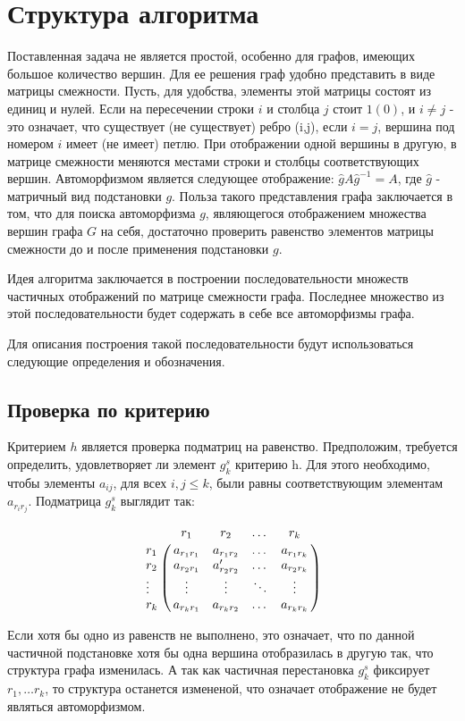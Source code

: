 \section{Структура алгоритма}
\label{sec:AlgoStruct_3} 
\large

Поставленная задача не является простой, особенно для графов, имеющих большое количество вершин. Для ее решения граф удобно представить в виде матрицы смежности. Пусть, для удобства, элементы этой матрицы состоят из единиц и нулей. Если на пересечении строки $i$ и столбца $j$ стоит $1(0)$, и $i\neq j$ - это означает, что существует (не существует) ребро (i,j), если $i = j$, вершина под номером $i$ имеет (не имеет) петлю. При отображении одной вершины в другую, в матрице смежности меняются местами строки и столбцы соответствующих вершин. Автоморфизмом является следующее отображение: $ \widehat{g} A \widehat{g}^{-1} =A  $, где $ \widehat{g}$ - матричный вид подстановки $g$. Польза такого представления графа заключается в том, что для поиска автоморфизма $g$, являющегося отображением множества вершин графа $G$ на себя, достаточно проверить равенство элементов матрицы смежности до и после применения подстановки $g$.

Идея алгоритма заключается в построении последовательности множеств частичных отображений по матрице смежности графа. Последнее множество из этой последовательности будет содержать в себе все автоморфизмы графа.

Для описания построения такой последовательности будут использоваться следующие определения и обозначения.

\subsection{Проверка по критерию}

Критерием $h$ является проверка подматриц на равенство. Предположим, требуется определить, удовлетворяет ли элемент $g^s_k$ критерию h. Для этого необходимо, чтобы элементы $a_{ij}$, для всех $i,j \leq k$, были равны соответствующим элементам $a_{r_ir_j}$. Подматрица $g^s_k$ выглядит так:

\[ \bordermatrix{
& r_1 & r_2 & \dots & r_k \cr
r_1 & a_{r_1r_1} & a_{r_1r_2} & \dots & a_{r_1r_k} \cr
r_2 & a_{r_2r_1} & a'_{r_2r_2} & \dots & a_{r_2r_k} \cr
\vdots & \vdots & \vdots & \ddots & \vdots \cr
r_k & a_{r_kr_1} & a_{r_kr_2} & \dots & a_{r_kr_k} \cr}
\]

Если хотя бы одно из равенств не выполнено, это означает, что по данной частичной подстановке хотя бы одна вершина отобразилась в другую так, что структура графа изменилась. А так как частичная перестановка $g^s_k$ фиксирует $r_1, \ldots r_k$, то структура останется измененой, что означает отображение не будет являться автоморфизмом.



